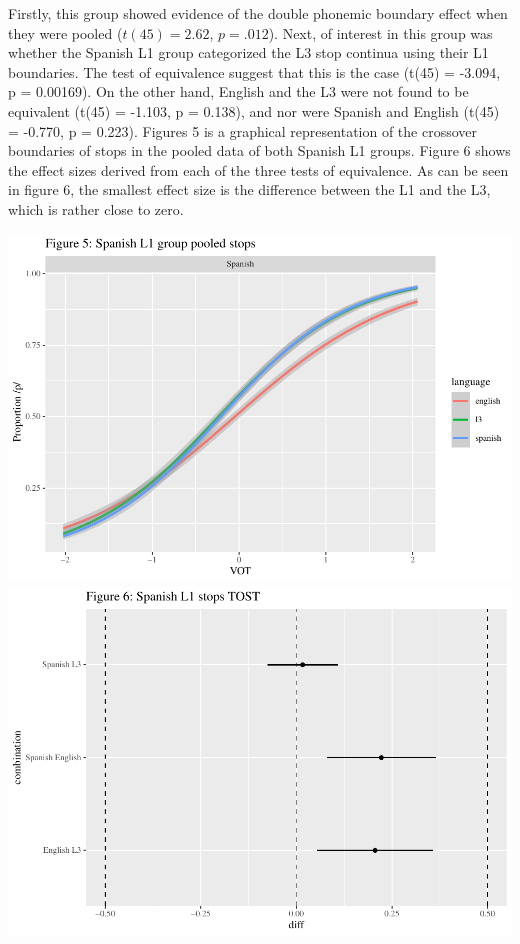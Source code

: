\documentclass[
  english,
  man]{apa6}
\begin{document}
Firstly, this group showed evidence of the double phonemic boundary effect when they were pooled (\(t(45) = 2.62\), \(p = .012\)).
Next, of interest in this group was whether the Spanish L1 group categorized the L3 stop continua using their L1 boundaries. The test of equivalence suggest that this is the case (t(45) = -3.094, p = 0.00169).
On the other hand, English and the L3 were not found to be equivalent (t(45) = -1.103, p = 0.138), and nor were Spanish and English (t(45) = -0.770, p = 0.223).
Figures 5 is a graphical representation of the crossover boundaries of stops in the pooled data of both Spanish L1 groups.
Figure 6 shows the effect sizes derived from each of the three tests of equivalence.
As can be seen in figure 6, the smallest effect size is the difference between the L1 and the L3, which is rather close to zero.

\includegraphics{master_files/figure-latex/unnamed-chunk-8-1.pdf} \includegraphics{master_files/figure-latex/unnamed-chunk-8-2.pdf}
\end{document}
